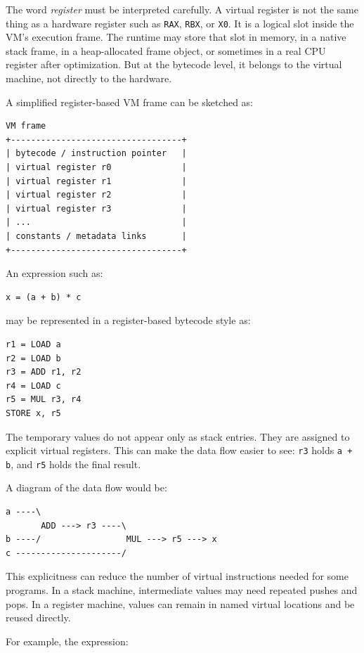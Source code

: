 \documentclass[a4paper,twoside]{report}
\begin{document}
The word \emph{register} must be interpreted carefully. A virtual register is not the same thing as a hardware register such as \texttt{RAX}, \texttt{RBX}, or \texttt{X0}. It is a logical slot inside the VM's execution frame. The runtime may store that slot in memory, in a native stack frame, in a heap-allocated frame object, or sometimes in a real CPU register after optimization. But at the bytecode level, it belongs to the virtual machine, not directly to the hardware.

A simplified register-based VM frame can be sketched as:

\begin{verbatim}
VM frame
+----------------------------------+
| bytecode / instruction pointer   |
| virtual register r0              |
| virtual register r1              |
| virtual register r2              |
| virtual register r3              |
| ...                              |
| constants / metadata links       |
+----------------------------------+
\end{verbatim}

An expression such as:

\begin{verbatim}
x = (a + b) * c
\end{verbatim}

may be represented in a register-based bytecode style as:

\begin{verbatim}
r1 = LOAD a
r2 = LOAD b
r3 = ADD r1, r2
r4 = LOAD c
r5 = MUL r3, r4
STORE x, r5
\end{verbatim}

The temporary values do not appear only as stack entries. They are assigned to explicit virtual registers. This can make the data flow easier to see: \texttt{r3} holds \texttt{a + b}, and \texttt{r5} holds the final result.

A diagram of the data flow would be:

\begin{verbatim}
a ----\
       ADD ---> r3 ----\
b ----/                 MUL ---> r5 ---> x
c ---------------------/
\end{verbatim}

This explicitness can reduce the number of virtual instructions needed for some programs. In a stack machine, intermediate values may need repeated pushes and pops. In a register machine, values can remain in named virtual locations and be reused directly.

For example, the expression:
\end{document}
